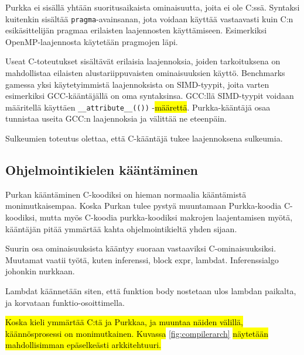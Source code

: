 Purkka ei sisällä yhtään suoritusaikaista ominaisuutta, joita ei ole C:ssä.
Syntaksi kuitenkin sisältää \texttt{pragma}-avainsanan, jota voidaan käyttää
vastaavasti kuin C:n esikäsittelijän pragmaa erilaisten laajennosten
käyttämiseen. Esimerkiksi OpenMP-laajennosta käytetään pragmojen läpi.

Useat C-toteutukset sisältävät erilaisia laajennoksia, joiden tarkoituksena on
mahdollistaa eilaisten alustariippuvaisten ominaisuuksien käyttö. Benchmarks
gamessa yksi käytetyimmistä laajennoksista on SIMD-tyypit, joita varten
esimerkiksi GCC-kääntäjällä on oma syntaksinsa. GCC:llä SIMD-tyypit voidaan
määritellä käyttäen \texttt{\_\_attribute\_\_(())} -\hl{määrettä}.
Purkka-kääntäjä osaa tunnistaa useita GCC:n laajennoksia ja välittää ne
eteenpäin.

Sulkeumien toteutus olettaa, että C-kääntäjä tukee laajennoksena sulkeumia.

\subsection{Ohjelmointikielen kääntäminen}

Purkan kääntäminen C-koodiksi on hieman normaalia kääntämistä monimutkaisempaa.
Koska Purkan tulee pystyä muuntamaan Purkka-koodia C-koodiksi, mutta myös
C-koodia purkka-koodiksi makrojen laajentamisen myötä, kääntäjän pitää ymmärtää
kahta ohjelmointikieltä yhden sijaan.

Suurin osa ominaisuuksista kääntyy suoraan vastaaviksi C-ominaisuuksiksi.
Muutamat vaatii työtä, kuten inferenssi, block expr, lambdat. Inferenssialgo
johonkin nurkkaan.

Lambdat käännetään siten, että funktion body nostetaan ulos lambdan paikalta,
ja korvataan funktio-osoittimella.

\hl{Koska kieli ymmärtää C:tä ja Purkkaa, ja muuntaa näiden välillä,
käännösprosessi on monimutkainen. Kuvassa} \ref{fig:compilerarch} \hl{näytetään
mahdollisimman epäselkeästi arkkitehtuuri.}

